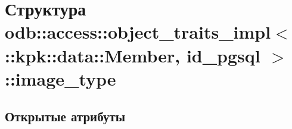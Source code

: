 \hypertarget{structodb_1_1access_1_1object__traits__impl_3_01_1_1kpk_1_1data_1_1_member_00_01id__pgsql_01_4_1_1image__type}{}\section{Структура odb\+:\+:access\+:\+:object\+\_\+traits\+\_\+impl$<$ \+:\+:kpk\+:\+:data\+:\+:Member, id\+\_\+pgsql $>$\+:\+:image\+\_\+type}
\label{structodb_1_1access_1_1object__traits__impl_3_01_1_1kpk_1_1data_1_1_member_00_01id__pgsql_01_4_1_1image__type}
\subsection*{Открытые атрибуты}
